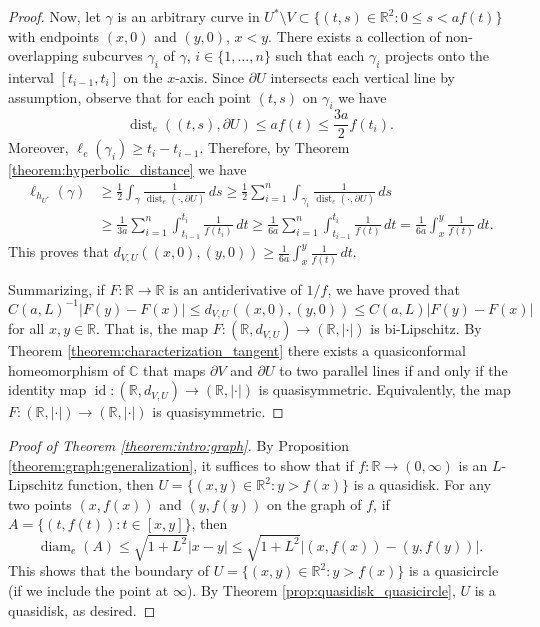 \documentclass[letterpaper]{amsart}
\theoremstyle{plain}
\theoremstyle{definition}
\theoremstyle{remark}
\numberwithin{equation}{section}
\numberwithin{theorem}{section}
\newcommand{\R}{\mathbb R}
\newcommand{\C}{\mathbb C}
\DeclareMathOperator{\dist}{dist}
\DeclareMathOperator{\diam}{diam}
\DeclareMathOperator{\id}{id}
\begin{document}
\begin{proof}
Now, let $\gamma$ is an arbitrary curve in $U^*\setminus V\subset \{(t,s)\in \R^2: 0\leq s<af(t)\}$ with endpoints $(x,0)$ and $(y,0)$, $x<y$. There exists a collection of non-overlapping subcurves $\gamma_i$ of $\gamma$, $i\in \{1,\dots,n\}$ such that each $\gamma_i$ projects onto the interval $[t_{i-1},t_i]$ on the $x$-axis. Since $\partial U$ intersects each vertical line by assumption, observe that for each point $(t,s)$ on $\gamma_i$ we have 
$$\dist_e((t,s), \partial U) \leq af(t)\leq \frac{3a}{2}f(t_i).$$
Moreover, $\ell_e(\gamma_i)\geq t_i-t_{i-1}$. Therefore, by Theorem \ref{theorem:hyperbolic_distance} we have
\begin{align*}
\ell_{h_{U^*}}(\gamma)&\geq \frac{1}{2}\int_\gamma \frac{1}{\dist_e(\cdot,\partial U)}\, ds \geq \frac{1}{2}\sum_{i=1}^n \int_{\gamma_i} \frac{1}{\dist_e(\cdot,\partial U)}\, ds  \\&\geq \frac{1}{3a}\sum_{i=1}^n \int_{t_{i-1}}^{t_i}\frac{1}{f(t_i)}\, dt
\geq  \frac{1}{6a}\sum_{i=1}^n \int_{t_{i-1}}^{t_i}\frac{1}{f(t)}\, dt=\frac{1}{6a} \int_{x}^{y}\frac{1}{f(t)}\, dt.
\end{align*}
This proves that $d_{V,U}((x,0),(y,0))\geq \frac{1}{6a}\int_x^y \frac{1}{f(t)}\, dt$. 

Summarizing, if $F\colon \R\to \R$ is an antiderivative of $1/f$, we have proved that 
$$C(a,L)^{-1} |F(y)-F(x)|\leq d_{V,U}((x,0),(y,0)) \leq C(a,L) |F(y)-F(x)|$$
for all $x,y\in \R$. That is, the map $F\colon (\R, d_{V,U})\to (\R,|\cdot|)$ is bi-Lipschitz. By Theorem \ref{theorem:characterization_tangent} there exists a quasiconformal homeomorphism of $\C$ that maps $\partial V$ and $\partial U$ to two parallel lines if and only if the identity map $\id\colon (\R,d_{V,U})\to  (\R,|\cdot|)$ is quasisymmetric. Equivalently, the map $F\colon (\R,|\cdot|)\to (\R,|\cdot|)$ is quasisymmetric.
\end{proof}

\begin{proof}[Proof of Theorem \ref{theorem:intro:graph}]
By Proposition \ref{theorem:graph:generalization}, it suffices to show that if  $f\colon \R\to (0,\infty)$ is an $L$-Lipschitz function, then $U=\{(x,y)\in \R^2: y>f(x)\}$ is a quasidisk. For any two points $(x,f(x))$ and $(y,f(y))$ on the graph of $f$, if $A=\{(t,f(t)): t\in [x,y]\}$, then 
$$\diam_e(A)\leq \sqrt{1+L^2}|x-y|\leq \sqrt{1+L^2}|(x,f(x))-(y,f(y))|.$$
This shows that the boundary of $U=\{(x,y)\in \R^2: y>f(x)\}$ is a quasicircle (if we include the point at $\infty$). By Theorem \ref{prop:quasidisk_quasicircle}, $U$ is a quasidisk, as desired.
\end{proof}
\end{document}
